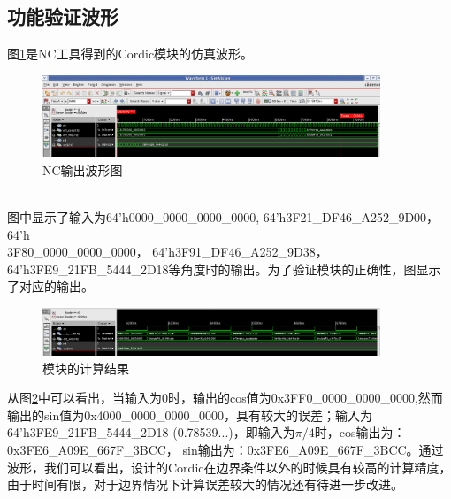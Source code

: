 \documentclass[a4paper,12pt]{report}
\begin{document}
\subsection{功能验证波形}
图\ref{figure3.1}是NC工具得到的Cordic模块的仿真波形。
\begin{figure}[!hbtp]
\centering
\includegraphics[width=0.9\textwidth]{NC1}
\caption{NC输出波形图}
\label{figure3.1}
\end{figure}\\
图中显示了输入为64'h0000\_0000\_0000\_0000, 64'h3F21\_DF46\_A252\_9D00， 64'h\\3F80\_0000\_0000\_0000， 64'h3F91\_DF46\_A252\_9D38，64'h3FE9\_21FB\_5444\_2D18等角度时的输出。为了验证模块的正确性，图显示了对应的输出。
\begin{figure}[!hbtp]
\centering
\includegraphics[width=0.9\textwidth]{NC2}
\caption{模块的计算结果}
\label{figure3.2}
\end{figure}
从图\ref{figure3.2}中可以看出，当输入为0时，输出的cos值为0x3FF0\_0000\_0000\_0000,然而输出的sin值为0x4000\_0000\_0000\_0000，具有较大的误差；输入为64'h3FE9\_21FB\_5444\_2D18 (0.78539...)，即输入为$\pi/4$时，cos输出为：0x3FE6\_A09E\_667F\_3BCC， sin输出为：0x3FE6\_A09E\_667F\_3BCC。通过波形，我们可以看出，设计的Cordic在边界条件以外的时候具有较高的计算精度，由于时间有限，对于边界情况下计算误差较大的情况还有待进一步改进。
\end{document}
